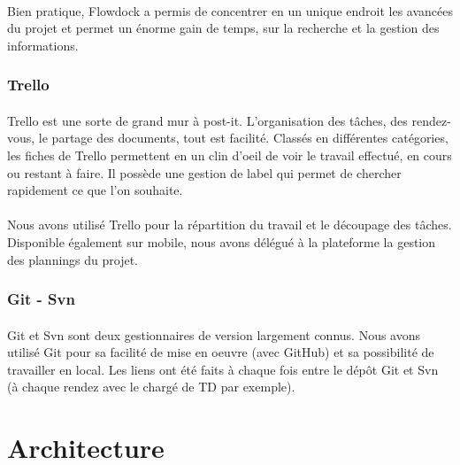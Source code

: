 \documentclass[12pt]{article}
\begin{document}
\paragraph{}Bien pratique, Flowdock a permis de concentrer en un unique endroit les avancées du projet et permet un énorme gain de temps, sur la recherche et la gestion des informations.

\subsubsection{Trello}

\paragraph{}Trello est une sorte de grand mur à post-it. L'organisation des tâches, des rendez-vous, le partage des documents, tout est facilité. Classés en différentes catégories, les fiches de Trello permettent en un clin d'oeil de voir le travail effectué, en cours ou restant à faire. Il possède une gestion de label qui permet de chercher rapidement ce que l'on souhaite.

\paragraph{}Nous avons utilisé Trello pour la répartition du travail et le découpage des tâches. Disponible également sur mobile, nous avons délégué à la plateforme la gestion des plannings du projet.

\subsubsection{Git - Svn}

\paragraph{}Git et Svn sont deux gestionnaires de version largement connus. Nous avons utilisé Git pour sa facilité de mise en oeuvre (avec GitHub) et sa possibilité de travailler en local. Les liens ont été faits à chaque fois entre le dépôt Git et Svn (à chaque rendez avec le chargé de TD par exemple).

\newpage

\section{Architecture}
\label{sec:Architecture}
\end{document}
